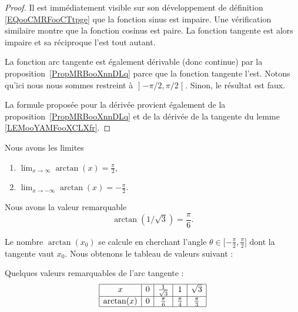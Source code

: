 	\begin{proof}
		Il est immédiatement visible sur son développement de définition \eqref{EQooCMRFooCTtpge} que la fonction sinus est impaire. Une vérification similaire montre que la fonction cosinus est paire. La fonction tangente est alors impaire et sa réciproque l'est tout autant.

		La fonction arc tangente est également dérivable (donc continue) par la proposition~\ref{PropMRBooXnnDLq} parce que la fonction tangente l'est. Notons qu'ici nous nous sommes restreint à \( \mathopen] -\pi/2 , \pi/2 \mathclose[\). Sinon, le résultat est faux.

		La formule proposée pour la dérivée provient également de la proposition~\ref{PropMRBooXnnDLq} et de la dérivée de la tangente du lemme \ref{LEMooYAMFooXCLXfr}.
	\end{proof}

	\begin{lemma}       \label{LEMooHRDCooGtnyeQ}
		Nous avons les limites
		\begin{enumerate}
			\item
			      \( \lim_{x\to \infty} \arctan(x)=\frac{ \pi }{2}\),
			\item
			      \( \lim_{x\to -\infty} \arctan(x)=-\frac{ \pi }{2}\).
		\end{enumerate}
	\end{lemma}

	\begin{lemma}       \label{LEMooJKIUooEMMOrs}
		Nous avons la valeur remarquable
		\begin{equation}
			\arctan(1/\sqrt{ 3 })=\frac{ \pi }{ 6 }.
		\end{equation}
	\end{lemma}

	Le nombre \( \arctan(x_0)\) se calcule en cherchant l'angle \( \theta\in\mathopen[ -\frac{ \pi }{2} , \frac{ \pi }{2} \mathclose]\) dont la tangente vaut \( x_0\). Nous obtenons le tableau de valeurs suivant :

	\begin{lemma}       \label{LEMooPQNCooDkEUyw}
		Quelques valeurs remarquables de l'arc tangente :
		\begin{equation}
			\begin{array}[]{|c|c|c|c|c|}
				\hline
				x          & 0 & \frac{1}{ \sqrt{3} } & 1                 & \sqrt{3}          \\
				\hline
				\arctan(x) & 0 & \frac{ \pi }{ 6 }    & \frac{ \pi }{ 4 } & \frac{ \pi }{ 3 } \\
				\hline
			\end{array}
		\end{equation}
	\end{lemma}

